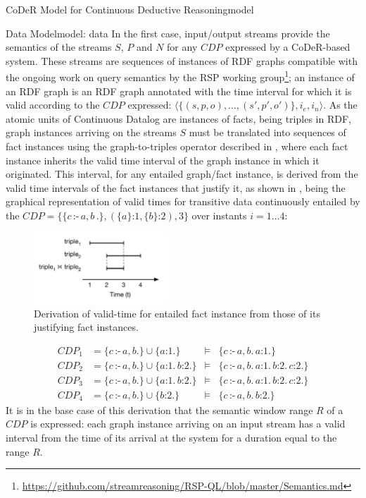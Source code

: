 \begin{nestedsection}{CoDeR Model for Continuous Deductive Reasoning}{model}
\begin{nestedsection}{Data Model}{model: data}
		In the first case, input/output streams provide the semantics of the streams $S$, $P$ and $N$ for any ${CDP}$ expressed by a CoDeR-based system.
		These streams are sequences of instances of RDF graphs compatible with the ongoing work on query semantics by the RSP working group\footnote{\url{https://github.com/streamreasoning/RSP-QL/blob/master/Semantics.md}};
		an instance of an RDF graph is an RDF graph annotated with the time interval for which it is valid \citep{SemanticStreamingManagement,sparkwave} according to the ${CDP}$ expressed: ${\langle \{(s,p,o),\dots,(s',p',o')\},i_{e},i_{n} \rangle}$.
		As the atomic units of Continuous Datalog are instances of facts, being triples in RDF, graph instances arriving on the streams $S$ must be translated into sequences of fact instances using the graph-to-triples operator described in , where each fact instance inherits the valid time interval of the graph instance in which it originated.
		This interval, for any entailed graph/fact instance, is derived from the valid time intervals of the fact instances that justify it, as shown in , being the graphical representation of valid times for transitive data continuously entailed by the ${CDP = \{\{c\,\text{:-}\,a,b\,.\},(\{a\}\text{:}1,\{b\}\text{:}2),3\}}$ over instants ${i = 1 \dots 4}$:
		\begin{figure}[t]
			\centering
			\includegraphics[width=0.45\textwidth]{intersected-intervals}
			\caption{Derivation of valid-time for entailed fact instance from those of its justifying fact instances.}
		\end{figure}
		\begin{align*}
			CDP_{1} & = \{c\,\text{:-}\,a,b.\} \cup \{ a\text{:}1. \} & \vDash & \{ c\,\text{:-}\,a,b. \, a\text{:}1. \} \\
			CDP_{2} & = \{c\,\text{:-}\,a,b.\} \cup \{ a\text{:}1. \, b\text{:}2. \} & \vDash & \{ c\,\text{:-}\,a,b. \, a\text{:}1. \, b\text{:}2. \, c\text{:}2. \} \\
			CDP_{3} & = \{c\,\text{:-}\,a,b.\} \cup \{ a\text{:}1. \, b\text{:}2. \} & \vDash & \{ c\,\text{:-}\,a,b. \, a\text{:}1. \, b\text{:}2. \, c\text{:}2. \} \\
			CDP_{4} & = \{c\,\text{:-}\,a,b.\} \cup \{ b\text{:}2. \} & \vDash & \{ c\,\text{:-}\,a,b. \, b\text{:}2. \}
		\end{align*}
		It is in the base case of this derivation that the semantic window range $R$ of a ${CDP}$ is expressed:
		each graph instance arriving on an input stream has a valid interval from the time of its arrival at the system for a duration equal to the range $R$.


\end{nestedsection}
\end{nestedsection}
